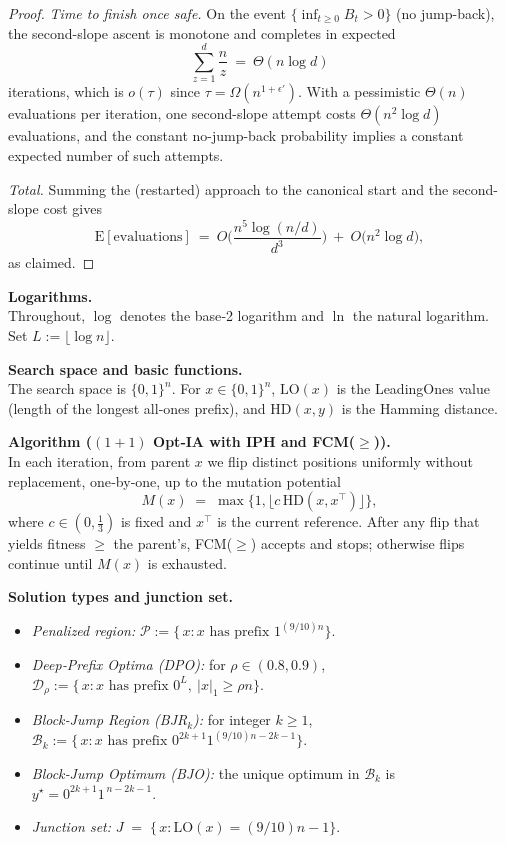 \documentclass[lettersize,journal]{IEEEtran}
\newcommand{\EE}{\text{E}}
\begin{document}
\begin{proof}
	\smallskip
	\emph{Time to finish once safe.}
	On the event $\{\inf_{t\ge 0} B_t>0\}$ (no jump-back), the second-slope ascent is monotone and completes in expected
	\[
	\sum_{z=1}^{d}\frac{n}{z}\ =\ \Theta(n\log d)
	\]
	iterations, which is $o(\tau)$ since $\tau=\Omega(n^{1+\epsilon'})$. With a pessimistic $\Theta(n)$ evaluations per iteration, one second-slope attempt costs $\Theta(n^{2}\log d)$ evaluations, and the constant no-jump-back probability implies a constant expected number of such attempts.
	
	\smallskip
	\emph{Total.}
	Summing the (restarted) approach to the canonical start and the second-slope cost gives
	\[
	\EE[\text{evaluations}]
	\ =\ O\!\Big(\frac{n^{5}\log(n/d)}{d^{3}}\Big)\ +\ O\!\big(n^{2}\log d\big),
	\]
	as claimed.
\end{proof}
\begin{definition}
	\label{def:notation-algo-solutions}
	
	\textbf{Logarithms.}\\
	Throughout, $\log$ denotes the base‐2 logarithm and $\ln$ the natural logarithm.  Set $L:=\lfloor \log n\rfloor$.
	
	\medskip\noindent
	\textbf{Search space and basic functions.}\\
	The search space is $\{0,1\}^n$.  For $x\in\{0,1\}^n$, $\mathrm{LO}(x)$ is the LeadingOnes value (length of the longest all‐ones prefix), and $\mathrm{HD}(x,y)$ is the Hamming distance.
	
	\medskip\noindent
	\textbf{Algorithm ($(1{+}1)$ Opt‐IA with IPH and FCM($\ge$)).}\\
	In each iteration, from parent $x$ we flip distinct positions uniformly without replacement, one‐by‐one, up to the mutation potential
	\[
	M(x) \;=\; \max\{1,\lfloor c\,\mathrm{HD}(x,x^\top)\rfloor\},
	\]
	where $c\in(0,\tfrac13)$ is fixed and $x^\top$ is the current reference.
	After any flip that yields fitness $\ge$ the parent’s, FCM($\ge$) accepts and stops; otherwise flips continue until $M(x)$ is exhausted.
	
	\medskip\noindent
	\textbf{Solution types and junction set.}\\
	\begin{itemize}
		\item \emph{Penalized region:}\quad
		$\displaystyle
		\mathcal{P}
		:= \bigl\{\,x:\text{$x$ has prefix }1^{(9/10)n}\bigr\}.
		$
		\item \emph{Deep‐Prefix Optima (DPO):} for $\rho\in(0.8,0.9)$,
		$\displaystyle
		\mathcal{D}_\rho
		:= \bigl\{\,x:\text{$x$ has prefix }0^L,\ |x|_1\ge \rho n\bigr\}.
		$
		\item \emph{Block‐Jump Region (BJR$_k$):} for integer $k\ge1$,
		$\displaystyle
		\mathcal{B}_k
		:= \bigl\{\,x:\text{$x$ has prefix }0^{2k+1}1^{(9/10)n-2k-1}\bigr\}.
		$
		\item \emph{Block‐Jump Optimum (BJO):}\quad
		the unique optimum in $\mathcal{B}_k$ is $y^\star = 0^{2k+1}1^{\,n-2k-1}$.
		\item \emph{Junction set:}\quad
		$\displaystyle
		J \;=\; \bigl\{\,x:\mathrm{LO}(x)=(9/10)n-1\bigr\}.
		$
	\end{itemize}
	

\end{definition}
\end{document}
